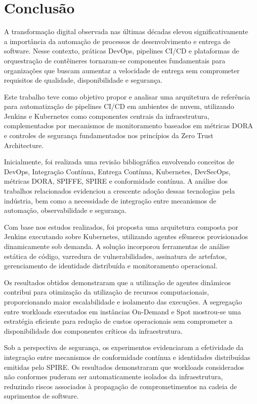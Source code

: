 \chapter{Conclusão}
\label{cap:conclusao}

A transformação digital observada nas últimas décadas elevou significativamente a importância da automação de processos de desenvolvimento e entrega de software. Nesse contexto, práticas DevOps, pipelines CI/CD e plataformas de orquestração de contêineres tornaram-se componentes fundamentais para organizações que buscam aumentar a velocidade de entrega sem comprometer requisitos de qualidade, disponibilidade e segurança.

Este trabalho teve como objetivo propor e analisar uma arquitetura de referência para automatização de pipelines CI/CD em ambientes de nuvem, utilizando Jenkins e Kubernetes como componentes centrais da infraestrutura, complementados por mecanismos de monitoramento baseados em métricas DORA e controles de segurança fundamentados nos princípios da Zero Trust Architecture.

Inicialmente, foi realizada uma revisão bibliográfica envolvendo conceitos de DevOps, Integração Contínua, Entrega Contínua, Kubernetes, DevSecOps, métricas DORA, SPIFFE, SPIRE e conformidade contínua. A análise dos trabalhos relacionados evidenciou a crescente adoção dessas tecnologias pela indústria, bem como a necessidade de integração entre mecanismos de automação, observabilidade e segurança.

Com base nos estudos realizados, foi proposta uma arquitetura composta por Jenkins executando sobre Kubernetes, utilizando agentes efêmeros provisionados dinamicamente sob demanda. A solução incorporou ferramentas de análise estática de código, varredura de vulnerabilidades, assinatura de artefatos, gerenciamento de identidade distribuída e monitoramento operacional.

Os resultados obtidos demonstraram que a utilização de agentes dinâmicos contribui para otimização da utilização de recursos computacionais, proporcionando maior escalabilidade e isolamento das execuções. A segregação entre workloads executados em instâncias On-Demand e Spot mostrou-se uma estratégia eficiente para redução de custos operacionais sem comprometer a disponibilidade dos componentes críticos da infraestrutura.

Sob a perspectiva de segurança, os experimentos evidenciaram a efetividade da integração entre mecanismos de conformidade contínua e identidades distribuídas emitidas pelo SPIRE. Os resultados demonstraram que workloads considerados não conformes puderam ser automaticamente isolados da infraestrutura, reduzindo riscos associados à propagação de comprometimentos na cadeia de suprimentos de software.


